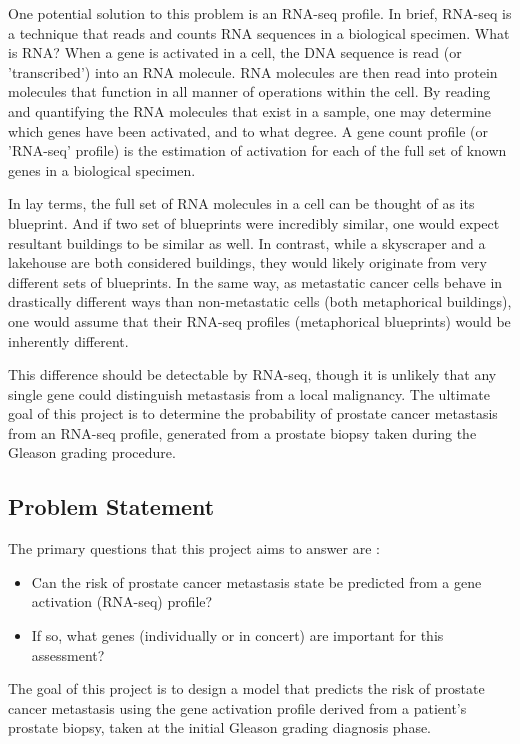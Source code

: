 \documentclass[final]{article}
\begin{document}
One potential solution to this problem is an RNA-seq profile.  In brief, RNA-seq
is a technique that reads and counts RNA sequences in a biological specimen.
What is RNA?  When a gene is activated in a cell, the DNA sequence is read (or
'transcribed') into an RNA molecule.  RNA molecules are then read  into protein
molecules that function in all manner of operations within the cell.  By reading
and quantifying the  RNA molecules that exist in a sample, one may determine
which genes have been activated, and to what degree.  A gene count profile (or 'RNA-seq' profile) is
the estimation of activation for each of the full set of known genes in a biological specimen.

In lay terms, the full set of RNA molecules in a cell can be  thought of as its
blueprint.  And if two set of blueprints were incredibly similar, one would
expect resultant buildings to be similar as well.  In contrast, while a
skyscraper and a lakehouse are both considered buildings, they would likely originate from very
different sets of blueprints.  In the same way, as metastatic cancer cells
behave in drastically  different ways than non-metastatic cells (both metaphorical buildings), one would
assume that their RNA-seq profiles (metaphorical blueprints) would be inherently different.

This difference should be detectable by RNA-seq, though it is unlikely that any
single gene could distinguish metastasis from a local malignancy. The ultimate
goal of this project is to determine the probability of prostate cancer metastasis
from an RNA-seq profile, generated from a prostate biopsy taken during the
Gleason grading procedure.

\subsection{Problem Statement}

The primary questions that this project aims to answer are :
\begin{itemize}
\item Can the risk of prostate cancer metastasis state be predicted from a gene activation (RNA-seq) profile?
\item If so, what genes (individually or in concert) are important for this assessment?
\end{itemize}

The goal of this project is to design a model that predicts the risk of prostate
cancer metastasis using the gene activation profile derived from a patient's
prostate biopsy, taken at the initial Gleason grading diagnosis phase.
\end{document}
